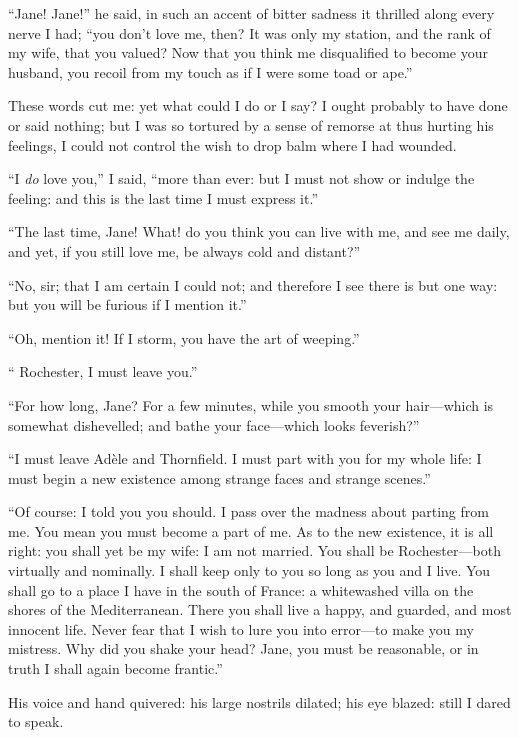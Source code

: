 \enquote{Jane! Jane!} he said, in such an accent of bitter sadness it
thrilled along every nerve I had; \enquote{you don't love me, then? It
	was only my station, and the rank of my wife, that you valued? Now that
	you think me disqualified to become your husband, you recoil from my
	touch as if I were some toad or ape.}

These words cut me: yet what could I do or I say? I ought probably to
have done or said nothing; but I was so tortured by a sense of remorse
at thus hurting his feelings, I could not control the wish to drop balm
where I had wounded.

\enquote{I \emph{do} love you,} I said, \enquote{more than ever: but I must
	not show or indulge the feeling: and this is the last time I must
	express it.}

\enquote{The last time, Jane! What! do you think you can live with me,
	and see me daily, and yet, if you still love me, be always cold and
	distant?}

\enquote{No, sir; that I am certain I could not; and therefore I see
	there is but one way: but you will be furious if I mention it.}

\enquote{Oh, mention it! If I storm, you have the art of weeping.}

\enquote{\Mr{} Rochester, I must leave you.}

\enquote{For how long, Jane? For a few minutes, while you smooth your
	hair---which is somewhat dishevelled; and bathe your face---which looks
	feverish?}

\enquote{I must leave Adèle and Thornfield. I must part with you for my
	whole life: I must begin a new existence among strange faces and strange
	scenes.}

\enquote{Of course: I told you you should. I pass over the madness
	about parting from me. You mean you must become a part of me. As to
	the new existence, it is all right: you shall yet be my wife: I am not
	married. You shall be \Mrs{} Rochester---both virtually and nominally. I
	shall keep only to you so long as you and I live. You shall go to a
	place I have in the south of France: a whitewashed villa on the shores
	of the Mediterranean. There you shall live a happy, and guarded, and
	most innocent life. Never fear that I wish to lure you into error---to
	make you my mistress. Why did you shake your head? Jane, you must be
	reasonable, or in truth I shall again become frantic.}

His voice and hand quivered: his large nostrils dilated; his eye blazed:
still I dared to speak.

